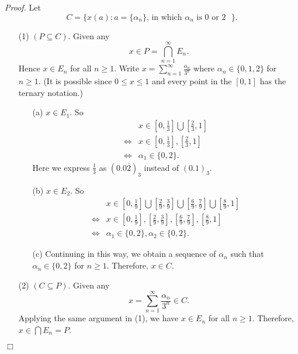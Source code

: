\documentclass{article}
\begin{document}
\emph{Proof.}
Let
\[
  C = \{ x(a) : \text{$a = \{ \alpha_n \}$, in which $\alpha_n$ is $0$ or $2$ } \}.
\]
\begin{enumerate}
\item[(1)]
$(P \subseteq C)$.
Given any
\[
  x \in P = \bigcap_{n=1}^{\infty} E_n.
\]
Hence $x \in E_n$ for all $n \geq 1$.
Write $x = \sum_{n=1}^{\infty} \frac{\alpha_n}{3^n}$
where $\alpha_n \in \{0,1,2\}$ for $n \geq 1$.
(It is possible since $0 \leq x \leq 1$
and every point in the $[0,1]$ has the ternary notation.)
  \begin{enumerate}
  \item[(a)]
  $x \in E_1$. So
  \begin{align*}
    &x \in \left[ 0,\frac{1}{3} \right] \bigcup \left[ \frac{2}{3},1 \right] \\
    \Longleftrightarrow&
    x \in \left[ 0,\frac{1}{3} \right], \left[ \frac{2}{3},1 \right] \\
    \Longleftrightarrow&
    \alpha_1 \in \{ 0,2 \}.
  \end{align*}
  Here we express $\frac{1}{3}$ as $(0.0\overline{2})_{3}$ instead of $(0.1)_{3}$.
  \item[(b)]
  $x \in E_2$. So
  \begin{align*}
    &x \in
      \left[ 0,\frac{1}{9} \right] \bigcup
      \left[ \frac{2}{9},\frac{3}{9} \right] \bigcup
      \left[ \frac{6}{9},\frac{7}{9} \right] \bigcup
      \left[ \frac{8}{9},1 \right] \\
    \Longleftrightarrow&
    x \in \left[ 0,\frac{1}{9} \right],
      \left[ \frac{2}{9},\frac{3}{9} \right],
      \left[ \frac{6}{9},\frac{7}{9} \right],
      \left[ \frac{8}{9},1 \right] \\
    \Longleftrightarrow&
    \alpha_1 \in \{ 0,2 \},
    \alpha_2 \in \{ 0,2 \}.
  \end{align*}
  \item[(c)]
  Continuing in this way, we obtain a sequence of $\alpha_n$
  such that $\alpha_n \in \{0,2\}$ for $n \geq 1$.
  Therefore, $x \in C$.
  \end{enumerate}
\item[(2)]
$(C \subseteq P)$.
Given any
\[
  x = \sum_{n=1}^{\infty} \frac{\alpha_n}{3^n} \in C.
\]
Applying the same argument in (1), we have
$x \in E_n$ for all $n \geq 1$.
Therefore, $x \in \bigcap E_n = P$.
\end{enumerate}
$\Box$ \\\\
\end{document}

